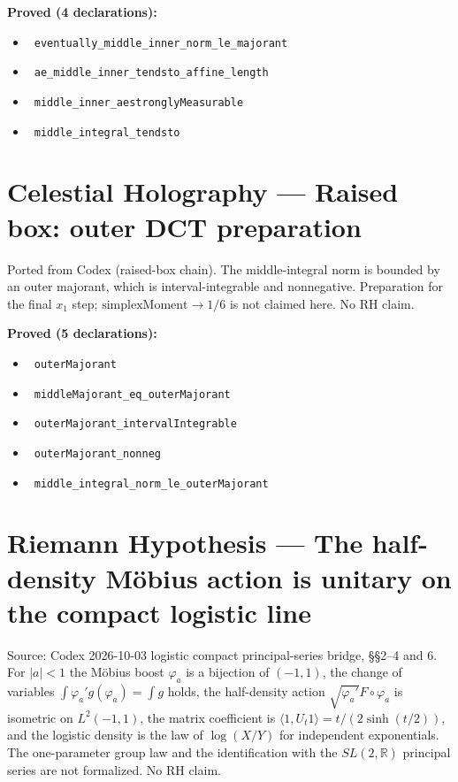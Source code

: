 \documentclass{report}
\theoremstyle{definition}
\begin{document}
\noindent\textbf{Proved (4 declarations):}
\begin{itemize}
  \item {}\leanok\ \texttt{eventually\_middle\_inner\_norm\_le\_majorant}
  \item {}\leanok\ \texttt{ae\_middle\_inner\_tendsto\_affine\_length}
  \item {}\leanok\ \texttt{middle\_inner\_aestronglyMeasurable}
  \item {}\leanok\ \texttt{middle\_integral\_tendsto}
\end{itemize}

\section{Celestial Holography --- Raised box: outer DCT preparation}
Ported from Codex (raised-box chain). The middle-integral norm is bounded by an outer majorant, which is interval-integrable and nonnegative. Preparation for the final $x_1$ step; $\mathrm{simplexMoment}\to1/6$ is not claimed here. No RH claim.

\noindent\textbf{Proved (5 declarations):}
\begin{itemize}
  \item {}\leanok\ \texttt{outerMajorant}
  \item {}\leanok\ \texttt{middleMajorant\_eq\_outerMajorant}
  \item {}\leanok\ \texttt{outerMajorant\_intervalIntegrable}
  \item {}\leanok\ \texttt{outerMajorant\_nonneg}
  \item {}\leanok\ \texttt{middle\_integral\_norm\_le\_outerMajorant}
\end{itemize}

\section{Riemann Hypothesis --- The half-density Möbius action is unitary on the compact logistic line}
Source: Codex 2026-10-03 logistic compact principal-series bridge, §§2–4 and 6. For $|a|<1$ the Möbius boost $\varphi_a$ is a bijection of $(-1,1)$, the change of variables $\int\varphi_a' g(\varphi_a)=\int g$ holds, the half-density action $\sqrt{\varphi_a'}F\circ\varphi_a$ is isometric on $L^2(-1,1)$, the matrix coefficient is $\langle1,U_t1\rangle=t/(2\sinh(t/2))$, and the logistic density is the law of $\log(X/Y)$ for independent exponentials. The one-parameter group law and the identification with the $SL(2,\mathbb R)$ principal series are not formalized. No RH claim.
\end{document}
